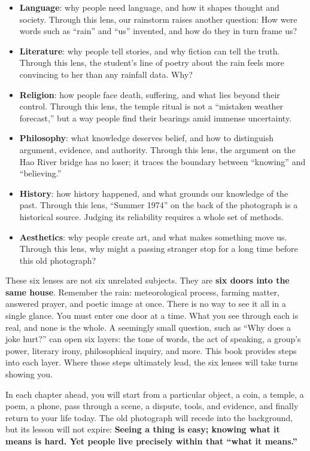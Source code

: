 \begin{itemize}
\item \textbf{Language}: why people need language, and how it shapes thought and society. Through this lens, our rainstorm raises another question: How were words such as ``rain'' and ``us'' invented, and how do they in turn frame us?
\item \textbf{Literature}: why people tell stories, and why fiction can tell the truth. Through this lens, the student's line of poetry about the rain feels more convincing to her than any rainfall data. Why?
\item \textbf{Religion}: how people face death, suffering, and what lies beyond their control. Through this lens, the temple ritual is not a ``mistaken weather forecast,'' but a way people find their bearings amid immense uncertainty.
\item \textbf{Philosophy}: what knowledge deserves belief, and how to distinguish argument, evidence, and authority. Through this lens, the argument on the Hao River bridge has no loser; it traces the boundary between ``knowing'' and ``believing.''
\item \textbf{History}: how history happened, and what grounds our knowledge of the past. Through this lens, ``Summer 1974'' on the back of the photograph is a historical source. Judging its reliability requires a whole set of methods.
\item \textbf{Aesthetics}: why people create art, and what makes something move us. Through this lens, why might a passing stranger stop for a long time before this old photograph?
\end{itemize}
These six lenses are not six unrelated subjects. They are \textbf{six doors into the same house}. Remember the rain: meteorological process, farming matter, answered prayer, and poetic image at once. There is no way to see it all in a single glance. You must enter one door at a time. What you see through each is real, and none is the whole. A seemingly small question, such as ``Why does a joke hurt?'' can open six layers: the tone of words, the act of speaking, a group's power, literary irony, philosophical inquiry, and more. This book provides steps into each layer. Where those steps ultimately lead, the six lenses will take turns showing you.

In each chapter ahead, you will start from a particular object, a coin, a temple, a poem, a phone, pass through a scene, a dispute, tools, and evidence, and finally return to your life today. The old photograph will recede into the background, but its lesson will not expire: \textbf{Seeing a thing is easy; knowing what it means is hard. Yet people live precisely within that ``what it means.''}

